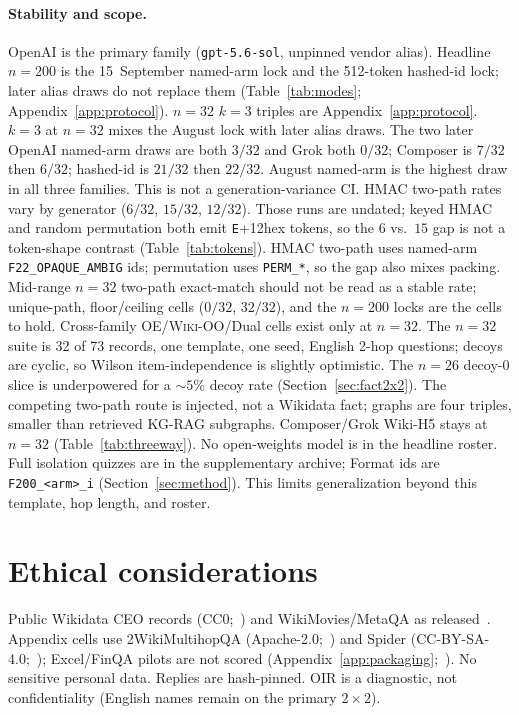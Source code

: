 \documentclass[10pt]{article} %
\begin{document}
\paragraph{Stability and scope.}
OpenAI is the primary family (\texttt{gpt-5.6-sol}, unpinned vendor alias).
Headline $n{=}200$ is the 15~September named-arm lock and the 512-token
hashed-id lock; later alias draws do not replace them
(Table~\ref{tab:modes}; Appendix~\ref{app:protocol}).
$n{=}32$ $k{=}3$ triples are Appendix~\ref{app:protocol}.
$k{=}3$ at $n{=}32$ mixes the August lock with later alias draws.
The two later OpenAI named-arm draws are both $3/32$ and Grok both
$0/32$; Composer is $7/32$ then $6/32$; hashed-id is $21/32$ then
$22/32$.
August named-arm is the highest draw in all three families.
This is not a generation-variance CI.
HMAC two-path rates vary by generator ($6/32$, $15/32$, $12/32$).
Those runs are undated; keyed HMAC and random permutation both emit
\texttt{E}+12hex tokens, so the $6$ vs.\ $15$ gap is not a token-shape
contrast (Table~\ref{tab:tokens}).
HMAC two-path uses named-arm \texttt{F22\_OPAQUE\_AMBIG} ids; permutation
uses \texttt{PERM\_*}, so the gap also mixes packing.
Mid-range $n{=}32$ two-path exact-match should not be read as a stable
rate; unique-path, floor/ceiling cells ($0/32$, $32/32$), and the
$n{=}200$ locks are the cells to hold.
Cross-family OE/\textsc{Wiki-OO}/Dual cells exist only at $n{=}32$.
The $n{=}32$ suite is 32 of 73 records, one template, one seed, English
2-hop questions; decoys are cyclic, so Wilson item-independence is
slightly optimistic.
The $n{=}26$ decoy-$0$ slice is underpowered for a ${\sim}5\%$ decoy rate
(Section~\ref{sec:fact2x2}).
The competing two-path route is injected, not a Wikidata fact; graphs are
four triples, smaller than retrieved KG-RAG subgraphs.
Composer/Grok Wiki-H5 stays at $n{=}32$ (Table~\ref{tab:threeway}).
No open-weights model is in the headline roster.
Full isolation quizzes are in the supplementary archive; Format ids are
\texttt{F200\_<arm>\_i}
(Section~\ref{sec:method}).
This limits generalization beyond this template, hop length, and roster.

\section*{Ethical considerations}

Public Wikidata CEO records (CC0;~\citealp{vrandecic2014wikidata}) and
WikiMovies/MetaQA as released~\citep{miller2016wikimovies,zhang2018metaqa}.
Appendix cells use 2WikiMultihopQA (Apache-2.0;~\citealp{ho2020constructing})
and Spider (CC-BY-SA-4.0;~\citealp{yu2018spider}); Excel/FinQA pilots are
not scored (Appendix~\ref{app:packaging};~\citealp{chen2021finqa}).
No sensitive personal data. Replies are hash-pinned.
OIR is a diagnostic, not confidentiality (English names remain on the
primary $2{\times}2$).
\end{document}
